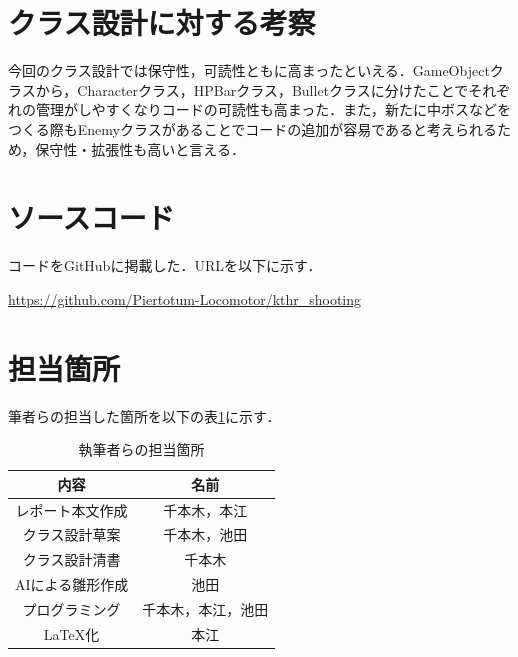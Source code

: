 \documentclass[dvipdfmx]{jlreq}
\begin{document}
\section{クラス設計に対する考察}
今回のクラス設計では保守性，可読性ともに高まったといえる．GameObjectクラスから，Characterクラス，HPBarクラス，Bulletクラスに分けたことでそれぞれの管理がしやすくなりコードの可読性も高まった．また，新たに中ボスなどをつくる際もEnemyクラスがあることでコードの追加が容易であると考えられるため，保守性・拡張性も高いと言える．

\section{ソースコード}
コードをGitHubに掲載した．URLを以下に示す．

\url{https://github.com/Piertotum-Locomotor/kthr_shooting}

\newpage

\section{担当箇所}
筆者らの担当した箇所を以下の表\ref{contribution}に示す．

\begin{table}[hbtp]
  \caption{執筆者らの担当箇所}
  \label{contribution}
  \centering
  \begin{tabular}{|c|c|}
    \hline
    内容 & 名前 \\
    \hline\hline
    レポート本文作成 & 千本木，本江 \\
    \hline
    クラス設計草案 &  千本木，池田\\
    \hline
    クラス設計清書 &  千本木\\
    \hline
    AIによる雛形作成 & 池田 \\
    \hline
    プログラミング & 千本木，本江，池田 \\
    \hline
    \LaTeX 化 & 本江\\
    \hline
  \end{tabular}
\end{table}
\end{document}
